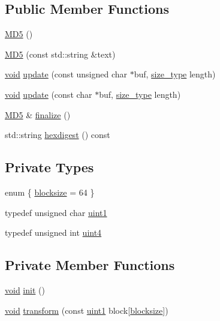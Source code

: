 \subsection*{Public Member Functions}
\begin{DoxyCompactItemize}
\item 
\hyperlink{class_m_d5_afa6155ec36de415ab2dcf5e54b670d13}{M\+D5} ()
\item 
\hyperlink{class_m_d5_a155356ffd713345e69e6dcbd9f8da6ce}{M\+D5} (const std\+::string \&text)
\item 
\hyperlink{_t_e_m_p_l_a_t_e__cdef_8h_ac9c84fa68bbad002983e35ce3663c686}{void} \hyperlink{class_m_d5_ac5ddf6cd8f940422396d321ea90ed045}{update} (const unsigned char $\ast$buf, \hyperlink{class_m_d5_aa836972700679dbcff6ae8337f6db464}{size\+\_\+type} length)
\item 
\hyperlink{_t_e_m_p_l_a_t_e__cdef_8h_ac9c84fa68bbad002983e35ce3663c686}{void} \hyperlink{class_m_d5_ac5ccba375539b993958fb235f8ac849c}{update} (const char $\ast$buf, \hyperlink{class_m_d5_aa836972700679dbcff6ae8337f6db464}{size\+\_\+type} length)
\item 
\hyperlink{class_m_d5}{M\+D5} \& \hyperlink{class_m_d5_a10f607494a3f2e3e515fc4b99d1a06cc}{finalize} ()
\item 
std\+::string \hyperlink{class_m_d5_ad36c65acf87e397bf717bc3defbc0c7a}{hexdigest} () const 
\end{DoxyCompactItemize}
\subsection*{Private Types}
\begin{DoxyCompactItemize}
\item 
enum \{ \hyperlink{class_m_d5_a6126af25978be88567667fa91a6b04a9a1cc0a742ca803f75a021aef77b522963}{blocksize} = 64
 \}
\item 
typedef unsigned char \hyperlink{class_m_d5_a3b1c4901139aef256ee49c4ab14d09f9}{uint1}
\item 
typedef unsigned int \hyperlink{class_m_d5_a2e5b84a3d7db292f49873061214a0444}{uint4}
\end{DoxyCompactItemize}
\subsection*{Private Member Functions}
\begin{DoxyCompactItemize}
\item 
\hyperlink{_t_e_m_p_l_a_t_e__cdef_8h_ac9c84fa68bbad002983e35ce3663c686}{void} \hyperlink{class_m_d5_a65ddaecdd0bd0b09043a2f3b2601bc2e}{init} ()
\item 
\hyperlink{_t_e_m_p_l_a_t_e__cdef_8h_ac9c84fa68bbad002983e35ce3663c686}{void} \hyperlink{class_m_d5_a9d569ab2a3e564793e116f774a3ad269}{transform} (const \hyperlink{class_m_d5_a3b1c4901139aef256ee49c4ab14d09f9}{uint1} block\mbox{[}\hyperlink{class_m_d5_a6126af25978be88567667fa91a6b04a9a1cc0a742ca803f75a021aef77b522963}{blocksize}\mbox{]})
\end{DoxyCompactItemize}
